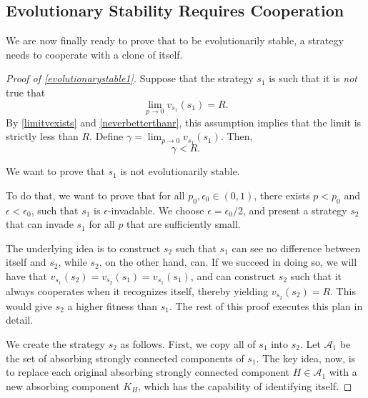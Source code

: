 \documentclass[11pt]{amsart}
\theoremstyle{definition}
\theoremstyle{remark}
\begin{document}
\subsection{Evolutionary Stability Requires Cooperation}

  We are now finally ready to prove that to be evolutionarily stable, a strategy needs to cooperate with a clone of itself.

    \begin{proof}[Proof of \cref{evolutionarystable1}]
      Suppose that the strategy $s_1$ is such that it is \textit{not} true that \begin{equation*}
        \lim_{p \to 0 } v_{s_1}(s_1) = R.
      \end{equation*}
      By \cref{limitvexists} and \cref{neverbetterthanr}, this assumption implies that the limit is strictly less than $R$. Define $\gamma = \lim_{p \to 0} v_{s_1}(s_1)$. Then,
      \begin{equation*}
        \gamma < R.
      \end{equation*}
      
      We want to prove that $s_1$ is not evolutionarily stable. 
      
      To do that, we want to prove that for all $p_0, \epsilon_0 \in (0,1)$, there exists $p < p_0$ and $\epsilon < \epsilon_0$, such that $s_1$ is $\epsilon$-invadable. We choose $\epsilon = \epsilon_0 / 2$, and present a strategy $s_2$ that can invade $s_1$ for all $p$ that are sufficiently small.


      The underlying idea is to construct $s_2$ such that $s_1$ can see no difference between itself and $s_2$, while $s_2$, on the other hand, can. If we succeed in doing so, we will have that $v_{s_1}(s_2) = v_{s_2}(s_1) = v_{s_1}(s_1)$, and can construct $s_2$ such that it always cooperates when it recognizes itself, thereby yielding $v_{s_2}(s_2) = R$. This would give $s_2$ a higher fitness than $s_1$. The rest of this proof executes this plan in detail.

      We create the strategy $s_2$ as follows. First, we copy all of $s_1$ into $s_2$. Let $\mathcal{A}_1$ be the set of
       absorbing strongly connected components of $s_1$. The key idea, now, is to replace each original absorbing strongly connected component $H \in \mathcal{A}_1$ with a new absorbing component $K_H$, which has the capability of identifying itself.


\end{proof}
\end{document}

